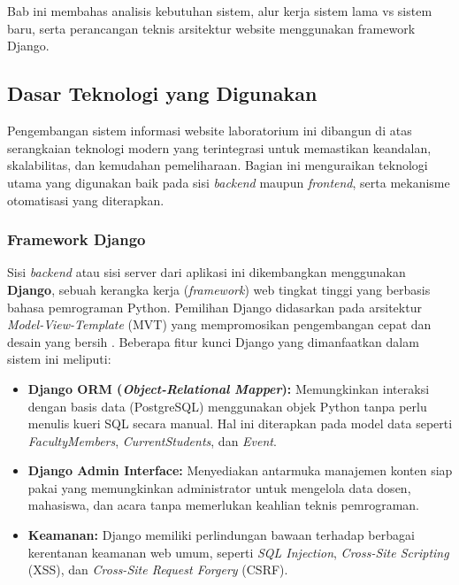 

\chapter{\babDua}
Bab ini membahas analisis kebutuhan sistem, alur kerja sistem lama vs sistem baru, serta perancangan teknis arsitektur website menggunakan framework Django.

\section{Dasar Teknologi yang Digunakan}
Pengembangan sistem informasi website laboratorium ini dibangun di atas serangkaian teknologi modern yang terintegrasi untuk memastikan keandalan, skalabilitas, dan kemudahan pemeliharaan. Bagian ini menguraikan teknologi utama yang digunakan baik pada sisi \textit{backend} maupun \textit{frontend}, serta mekanisme otomatisasi yang diterapkan.

\subsection{Framework Django}
Sisi \textit{backend} atau sisi server dari aplikasi ini dikembangkan menggunakan \textbf{Django}, sebuah kerangka kerja (\textit{framework}) web tingkat tinggi yang berbasis bahasa pemrograman Python. Pemilihan Django didasarkan pada arsitektur \textit{Model-View-Template} (MVT) yang mempromosikan pengembangan cepat dan desain yang bersih \cite{django2024}. Beberapa fitur kunci Django yang dimanfaatkan dalam sistem ini meliputi:
\begin{itemize}
    \item \textbf{Django ORM (\textit{Object-Relational Mapper}):} Memungkinkan interaksi dengan basis data (PostgreSQL) menggunakan objek Python tanpa perlu menulis kueri SQL secara manual. Hal ini diterapkan pada model data seperti \textit{FacultyMembers}, \textit{CurrentStudents}, dan \textit{Event}.
    \item \textbf{Django Admin Interface:} Menyediakan antarmuka manajemen konten siap pakai yang memungkinkan administrator untuk mengelola data dosen, mahasiswa, dan acara tanpa memerlukan keahlian teknis pemrograman.
    \item \textbf{Keamanan:} Django memiliki perlindungan bawaan terhadap berbagai kerentanan keamanan web umum, seperti \textit{SQL Injection}, \textit{Cross-Site Scripting} (XSS), dan \textit{Cross-Site Request Forgery} (CSRF).
\end{itemize}

